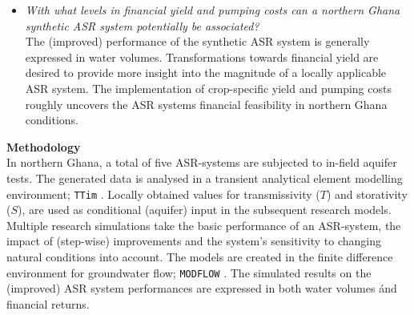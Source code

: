 \begin{itemize}
\item{\textit{With what levels in financial yield and pumping costs can a northern Ghana synthetic ASR system potentially be associated?}
\smallskip \\
The (improved) performance of the synthetic ASR system is generally expressed in water volumes. Transformations towards financial yield are desired to provide more insight into the magnitude of a locally applicable ASR system. The implementation of crop-specific yield and pumping costs roughly uncovers the ASR systems financial feasibility in northern Ghana conditions.}
\end{itemize}

\textbf{Methodology} \\
In northern Ghana, a total of five ASR-systems are subjected to in-field aquifer tests. The generated data is analysed in a transient analytical element modelling environment; \texttt{TTim} \citep{Mishra2013,Bakker2013}. Locally obtained values for transmissivity ($T$) and storativity ($S$), are used as conditional (aquifer) input in the subsequent research models. Multiple research simulations take the basic performance of an ASR-system, the impact of (step-wise) improvements and the system's sensitivity to changing natural conditions into account. The models are created in the finite difference environment for groundwater flow; \texttt{MODFLOW} \citep{Niswonger2011,HarbaughArlen2005}. The simulated results on the (improved) ASR system performances are expressed in both water volumes ánd financial returns. \\ 

